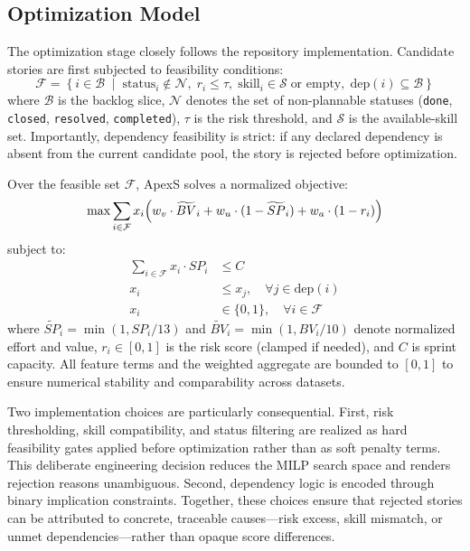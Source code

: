 \documentclass[conference]{IEEEtran}
\begin{document}
\subsection{Optimization Model}

The optimization stage closely follows the repository implementation.
Candidate stories are first subjected to feasibility conditions:
\begin{equation}
	\mathcal{F} =
	\left\{
	i \in \mathcal{B} \;\middle|\;
	\text{status}_i \notin \mathcal{N},\;
	r_i \le \tau,\;
	\text{skill}_i \in \mathcal{S} \;\text{or empty},\;
	\text{dep}(i) \subseteq \mathcal{B}
	\right\}
	\label{eq:feasible}
\end{equation}
where $\mathcal{B}$ is the backlog slice, $\mathcal{N}$ denotes the set of
non-plannable statuses (\texttt{done}, \texttt{closed}, \texttt{resolved},
\texttt{completed}), $\tau$ is the risk threshold, and $\mathcal{S}$ is the
available-skill set. Importantly, dependency feasibility is strict: if any declared
dependency is absent from the current candidate pool, the story is rejected before
optimization.

Over the feasible set $\mathcal{F}$, ApexS solves a normalized objective:
\begin{equation}
	\max \sum_{i \in \mathcal{F}} x_i
	\Bigl(
	w_v \cdot \widetilde{BV}_i +
	w_u \cdot (1 - \widetilde{SP}_i) +
	w_a \cdot (1 - r_i)
	\Bigr)
	\label{eq:objective}
\end{equation}
subject to:
\begin{align}
	\sum_{i \in \mathcal{F}} x_i \cdot SP_i & \le C \label{eq:capacity}                                      \\
	x_i                                     & \le x_j, \quad \forall j \in \text{dep}(i) \label{eq:deps}     \\
	x_i                                     & \in \{0,1\}, \quad \forall i \in \mathcal{F} \label{eq:binary}
\end{align}
where $\widetilde{SP}_i = \min(1, SP_i/13)$ and
$\widetilde{BV}_i = \min(1, BV_i/10)$ denote normalized effort and value,
$r_i \in [0,1]$ is the risk score (clamped if needed), and $C$ is sprint capacity.
All feature terms and the weighted aggregate are bounded to $[0,1]$ to ensure
numerical stability and comparability across datasets.

Two implementation choices are particularly consequential.
First, risk thresholding, skill compatibility, and status filtering are realized as
hard feasibility gates applied before optimization rather than as soft penalty
terms. This deliberate engineering decision reduces the MILP search space and
renders rejection reasons unambiguous.
Second, dependency logic is encoded through binary implication constraints.
Together, these choices ensure that rejected stories can be attributed to
concrete, traceable causes---risk excess, skill mismatch, or unmet
dependencies---rather than opaque score differences.
\end{document}
